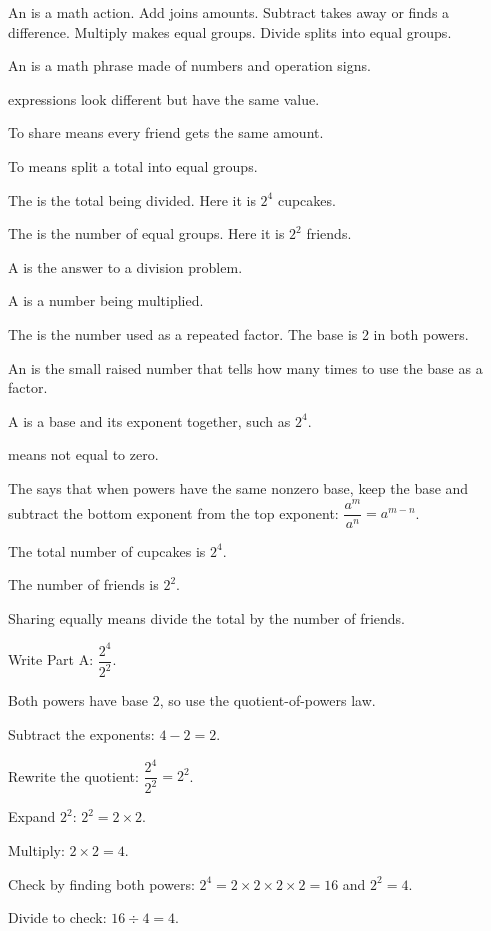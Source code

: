 \begin{words}
  \item An is a math action. Add joins amounts. Subtract takes
    away or finds a difference. Multiply makes equal groups. Divide splits into
    equal groups.
  \item An is a math phrase made of numbers and operation signs.
  \item {}expressions look different but have the same value.
  \item To share means every friend gets the same amount.
  \item To means split a total into equal groups.
  \item The is the total being divided. Here it is $2^{4}$
    cupcakes.
  \item The is the number of equal groups. Here it is $2^{2}$
    friends.
  \item A is the answer to a division problem.
  \item A is a number being multiplied.
  \item The is the number used as a repeated factor. The base is 2 in
    both powers.
  \item An is the small raised number that tells how many times to
    use the base as a factor.
  \item A is a base and its exponent together, such as $2^{4}$.
  \item {}means not equal to zero.
  \item The says that when powers have the same
    nonzero base, keep the base and subtract the bottom exponent from the top
    exponent: $\dfrac{a^{m}}{a^{n}} = a^{m-n}$.
\end{words}

\begin{steps}
  \item The total number of cupcakes is $2^{4}$.
  \item The number of friends is $2^{2}$.
  \item Sharing equally means divide the total by the number of friends.
  \item Write Part A: $\dfrac{2^{4}}{2^{2}}$.
  \item Both powers have base 2, so use the quotient-of-powers law.
  \item Subtract the exponents: $4 - 2 = 2$.
  \item Rewrite the quotient: $\dfrac{2^{4}}{2^{2}} = 2^{2}$.
  \item Expand $2^{2}$: $2^{2} = 2 \times 2$.
  \item Multiply: $2 \times 2 = 4$.
  \item Check by finding both powers: $2^{4} = 2 \times 2 \times 2 \times 2 = 16$
    and $2^{2} = 4$.
  \item Divide to check: $16 \div 4 = 4$.
\end{steps}

